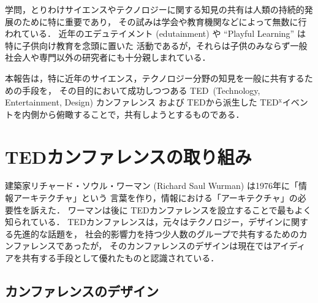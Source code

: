 \documentclass[submit,techreq,jkeyword,noauthor]{ipsj}
\newcommand{\TED}{\textrm{TED}}
\newcommand{\TEDx}{\TED${}^{\textrm{x}}$}
\newcommand{\TEDtitle}{\textbf{TED}}
\begin{document}
学問，とりわけサイエンスやテクノロジーに関する知見の共有は人類の持続的発展のために特に重要であり，
その試みは学会や教育機関などによって無数に行われている．
近年のエデュテイメント (edutainment) や ``Playful Learning'' は特に子供向け教育を念頭に置いた
活動であるが，それらは子供のみならず一般社会人や専門以外の研究者にも十分親しまれている．\cite{nu}



本報告は，特に近年のサイエンス，テクノロジー分野の知見を一般に共有するための手段を，
その目的において成功しつつある \TED\ (Technology, Entertainment, Design) カンファレンス
および \TED から派生した \TEDx イベントを内側から俯瞰することで，共有しようとするものである．



\section{\TEDtitle カンファレンスの取り組み}

建築家リチャード・ソウル・ワーマン (Richard Saul Wurman) は1976年に「情報アーキテクチャ」という
言葉を作り，情報における「アーキテクチャ」の必要性を訴えた．\cite{rsw}
ワーマンは後に \TED カンファレンスを設立することで最もよく知られている．
\TED カンファレンスは，元々はテクノロジー，デザインに関する先進的な話題を，
社会的影響力を持つ少人数のグループで共有するためのカンファレンスであったが，
そのカンファレンスのデザインは現在ではアイディアを共有する手段として優れたものと認識されている．

\subsection{カンファレンスのデザイン}
\end{document}
